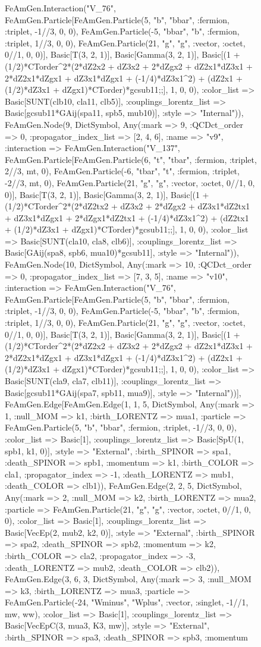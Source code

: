 \documentclass{revtex4}
\begin{document}
\begin{figure}[!htb]
\begin{center}
{FeAmGen.Interaction("V_76", FeAmGen.Particle[FeAmGen.Particle(5, "b", "bbar", :fermion, :triplet, -1//3, 0, 0), FeAmGen.Particle(-5, "bbar", "b", :fermion, :triplet, 1//3, 0, 0), FeAmGen.Particle(21, "g", "g", :vector, :octet, 0//1, 0, 0)], Basic[T(3, 2, 1)], Basic[Gamma(3, 2, 1)], Basic[(1 + (1/2)*CTorder^2*(2*dZ2x2 + dZ3x2 + 2*dZgx2 + dZ2x1*dZ3x1 + 2*dZ2x1*dZgx1 + dZ3x1*dZgx1 + (-1/4)*dZ3x1^2) + (dZ2x1 + (1/2)*dZ3x1 + dZgx1)*CTorder)*gcsub11;;], 1, 0, 0), :color_list => Basic[SUNT(clb10, cla11, clb5)], :couplings_lorentz_list => Basic[gcsub11*GAij(spa11, spb5, mub10)], :style => "Internal")), FeAmGen.Node(9, Dict{Symbol, Any}(:mark => 9, :QCDct_order => 0, :propagator_index_list => [2, 4, 6], :name => "v9", :interaction => FeAmGen.Interaction("V_137", FeAmGen.Particle[FeAmGen.Particle(6, "t", "tbar", :fermion, :triplet, 2//3, mt, 0), FeAmGen.Particle(-6, "tbar", "t", :fermion, :triplet, -2//3, mt, 0), FeAmGen.Particle(21, "g", "g", :vector, :octet, 0//1, 0, 0)], Basic[T(3, 2, 1)], Basic[Gamma(3, 2, 1)], Basic[(1 + (1/2)*CTorder^2*(2*dZ2tx2 + dZ3x2 + 2*dZgx2 + dZ3x1*dZ2tx1 + dZ3x1*dZgx1 + 2*dZgx1*dZ2tx1 + (-1/4)*dZ3x1^2) + (dZ2tx1 + (1/2)*dZ3x1 + dZgx1)*CTorder)*gcsub11;;], 1, 0, 0), :color_list => Basic[SUNT(cla10, cla8, clb6)], :couplings_lorentz_list => Basic[GAij(spa8, spb6, mua10)*gcsub11], :style => "Internal")), FeAmGen.Node(10, Dict{Symbol, Any}(:mark => 10, :QCDct_order => 0, :propagator_index_list => [7, 3, 5], :name => "v10", :interaction => FeAmGen.Interaction("V_76", FeAmGen.Particle[FeAmGen.Particle(5, "b", "bbar", :fermion, :triplet, -1//3, 0, 0), FeAmGen.Particle(-5, "bbar", "b", :fermion, :triplet, 1//3, 0, 0), FeAmGen.Particle(21, "g", "g", :vector, :octet, 0//1, 0, 0)], Basic[T(3, 2, 1)], Basic[Gamma(3, 2, 1)], Basic[(1 + (1/2)*CTorder^2*(2*dZ2x2 + dZ3x2 + 2*dZgx2 + dZ2x1*dZ3x1 + 2*dZ2x1*dZgx1 + dZ3x1*dZgx1 + (-1/4)*dZ3x1^2) + (dZ2x1 + (1/2)*dZ3x1 + dZgx1)*CTorder)*gcsub11;;], 1, 0, 0), :color_list => Basic[SUNT(cla9, cla7, clb11)], :couplings_lorentz_list => Basic[gcsub11*GAij(spa7, spb11, mua9)], :style => "Internal"))], FeAmGen.Edge[FeAmGen.Edge(1, 1, 5, Dict{Symbol, Any}(:mark => 1, :null_MOM => k1, :birth_LORENTZ => mua1, :particle => FeAmGen.Particle(5, "b", "bbar", :fermion, :triplet, -1//3, 0, 0), :color_list => Basic[1], :couplings_lorentz_list => Basic[SpU(1, spb1, k1, 0)], :style => "External", :birth_SPINOR => spa1, :death_SPINOR => spb1, :momentum => k1, :birth_COLOR => cla1, :propagator_index => -1, :death_LORENTZ => mub1, :death_COLOR => clb1)), FeAmGen.Edge(2, 2, 5, Dict{Symbol, Any}(:mark => 2, :null_MOM => k2, :birth_LORENTZ => mua2, :particle => FeAmGen.Particle(21, "g", "g", :vector, :octet, 0//1, 0, 0), :color_list => Basic[1], :couplings_lorentz_list => Basic[VecEp(2, mub2, k2, 0)], :style => "External", :birth_SPINOR => spa2, :death_SPINOR => spb2, :momentum => k2, :birth_COLOR => cla2, :propagator_index => -3, :death_LORENTZ => mub2, :death_COLOR => clb2)), FeAmGen.Edge(3, 6, 3, Dict{Symbol, Any}(:mark => 3, :null_MOM => k3, :birth_LORENTZ => mua3, :particle => FeAmGen.Particle(-24, "Wminus", "Wplus", :vector, :singlet, -1//1, mw, ww), :color_list => Basic[1], :couplings_lorentz_list => Basic[VecEpC(3, mua3, K3, mw)], :style => "External", :birth_SPINOR => spa3, :death_SPINOR => spb3, :momentum }
\end{center}
\end{figure}
\end{document}
